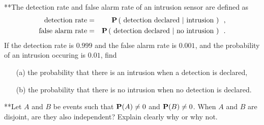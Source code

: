 \begin{ExerciseList}
\Exercise
{**}The detection rate and false alarm rate of an intrusion sensor are defined as
\begin{eqnarray*}
\text{detection rate} &=& \mathbf{P} \left( \text{ detection declared } | \text{ intrusion } \right) \enspace ,\\
\text{false alarm rate} &=& \mathbf{P} \left( \text{ detection declared } | \text{ no intrusion } \right) \enspace .
\end{eqnarray*}
If the detection rate is $0.999$ and the false alarm rate is $0.001$, and the probability of an intrusion occuring is $0.01$, find
\begin{itemize}
\item[(a)] the probability that there is an intrusion when a detection is declared,
\item[(b)] the probability that there is no intrusion when no detection is declared.
\end{itemize}

\Exercise
{**}Let $A$ and $B$ be events such that $\mathbf{P}(A) \neq 0$ and $\mathbf{P}(B) \neq 0$.  
When $A$ and $B$ are disjoint, are they also independent?  
Explain clearly why or why not.

\end{ExerciseList}

